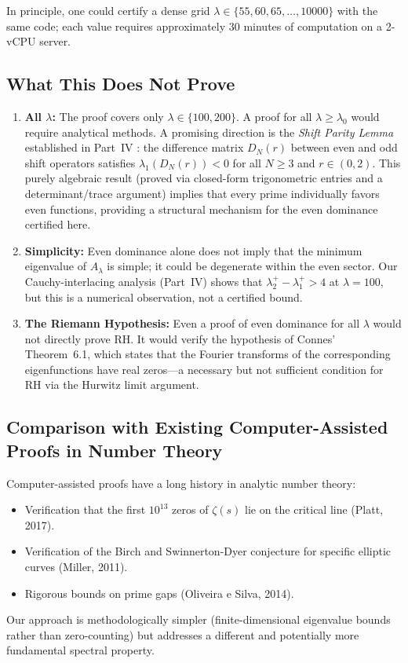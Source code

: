 \documentclass[12pt,a4paper]{article}
\theoremstyle{definition}
\theoremstyle{remark}
\begin{document}
In principle, one could certify a dense grid $\lambda \in \{55, 60, 65, \ldots, 10000\}$ with the same code; each value requires approximately 30 minutes of computation on a 2-vCPU server.

\subsection{What This Does Not Prove}

\begin{enumerate}
  \item \textbf{All $\lambda$:} The proof covers only $\lambda \in \{100, 200\}$. A proof for all $\lambda \geq \lambda_0$ would require analytical methods. A promising direction is the \emph{Shift Parity Lemma} established in Part~IV \cite{Geiger2026partIV}: the difference matrix $D_N(r)$ between even and odd shift operators satisfies $\lambda_1(D_N(r)) < 0$ for all $N \geq 3$ and $r \in (0,2)$. This purely algebraic result (proved via closed-form trigonometric entries and a determinant/trace argument) implies that every prime individually favors even functions, providing a structural mechanism for the even dominance certified here.

  \item \textbf{Simplicity:} Even dominance alone does not imply that the minimum eigenvalue of $A_\lambda$ is simple; it could be degenerate within the even sector. Our Cauchy-interlacing analysis (Part~IV) shows that $\lambda_2^+ - \lambda_1^+ > 4$ at $\lambda = 100$, but this is a numerical observation, not a certified bound.

  \item \textbf{The Riemann Hypothesis:} Even a proof of even dominance for all $\lambda$ would not directly prove RH. It would verify the hypothesis of Connes' Theorem~6.1, which states that the Fourier transforms of the corresponding eigenfunctions have real zeros---a necessary but not sufficient condition for RH via the Hurwitz limit argument.
\end{enumerate}

\subsection{Comparison with Existing Computer-Assisted Proofs in Number Theory}

Computer-assisted proofs have a long history in analytic number theory:
\begin{itemize}
  \item Verification that the first $10^{13}$ zeros of $\zeta(s)$ lie on the critical line (Platt, 2017).
  \item Verification of the Birch and Swinnerton-Dyer conjecture for specific elliptic curves (Miller, 2011).
  \item Rigorous bounds on prime gaps (Oliveira e Silva, 2014).
\end{itemize}
Our approach is methodologically simpler (finite-dimensional eigenvalue bounds rather than zero-counting) but addresses a different and potentially more fundamental spectral property.
\end{document}
